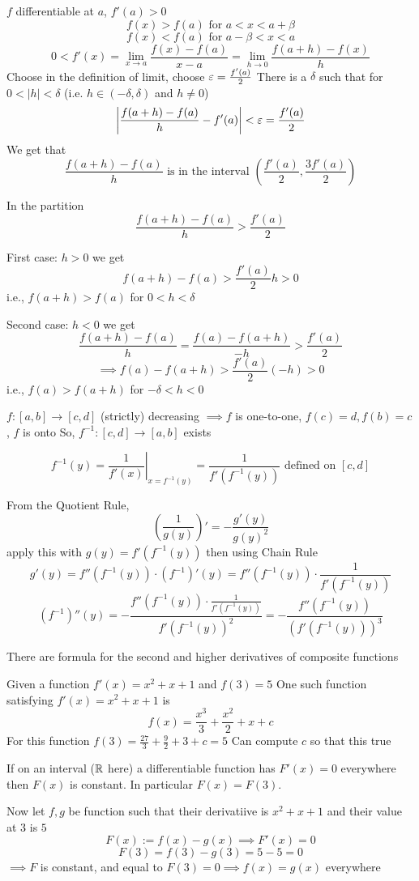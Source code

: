 \begin{example*}[Q2]
  $f$ differentiable at $a$, $f'(a) > 0$  
  $$f(x) > f(a) \text{ for } a < x < a + \beta$$
  $$f(x) < f(a)\text{ for } a - \beta < x < a$$
  $$0 < f'(x) = \lim\limits_{x \to a} \frac{f(x) - f(a)}{x - a} = \lim\limits_{h \to 0}\frac{f(a + h) - f(x)}{h}$$
  Choose in the definition of limit, choose $\varepsilon = \frac{f'(a)}{2}$
  There is a $\delta$ such that for $0 < |h| < \delta$ (i.e. $h \in (-\delta, \delta)$ and $h \neq 0$)
  $$\left|\frac{f(a+h) - f(a)}{h} - f'(a)\right| < \varepsilon = \frac{f'(a)}{2}$$
  We get that $$\frac{f(a+h) - f(a)}{h} \text{ is in the interval }\left(\frac{f'(a)}{2}, \frac{3f'(a)}{2}\right)$$

  In the partition $$\frac{f(a+h) - f(a)}{h} > \frac{f'(a)}{2}$$

  First case: $h > 0$ we get $$f(a + h) - f(a) > \frac{f'(a)}{2}h > 0$$ 
  i.e., $f(a + h) > f(a)$ for $0 < h < \delta$

  Second case: $h < 0$ we get $$\frac{f(a + h) - f(a)}{h} = \frac{f(a) - f(a+h)}{-h} > \frac{f'(a)}{2}$$
  $$\implies f(a) - f(a+h) > \frac{f'(a)}{2}(-h) > 0$$
  i.e., $f(a) > f(a + h)$ for $-\delta < h < 0$
\end{example*}

\begin{example*}[Q9]
  $f: [a, b] \to [c, d]$ (strictly) decreasing $\implies f$ is one-to-one, $f(c) = d, f(b) = c$, $f$ is onto
  So, $f^{-1}:[c, d] \to [a, b]$ exists

  $$f^{-1}(y) = \left.\frac{1}{f'(x)}\right|_{x = f^{-1}(y)} = \frac{1}{f'(f^{-1}(y))}\text{ defined on }[c, d]$$

  From the Quotient Rule, $$\left(\frac{1}{g(y)}\right)' = -\frac{g'(y)}{g(y)^2}$$
  apply this with $g(y) = f'(f^{-1}(y))$ then using Chain Rule
  $$g'(y) = f''(f^{-1}(y)) \cdot (f^{-1})'(y) = f''(f^{-1}(y))\cdot \frac{1}{f'(f^{-1}(y))}$$
  $$(f^{-1})''(y) = - \frac{f''(f^{-1}(y)) \cdot \frac{1}{f'(f^{-1}(y))}}{f'(f^{-1}(y))^2} = -\frac{f''(f^{-1}(y))}{(f'(f^{-1}(y)))^3}$$
\end{example*}

There are formula for the second and higher derivatives of composite functions

\begin{example*}[Q6]
  Given a function $f'(x) = x^2 + x + 1$ and $f(3) = 5$
  One such function satisfying $f'(x) = x^2 + x + 1$ is 
  $$f(x) = \frac{x^3}{3} + \frac{x^2}{2} + x + c$$
  For this function $f(3) = \frac{27}{3} + \frac{9}{2} + 3 + c = 5$
  Can compute $c$ so that this true

  If on an interval ($\mathbb R$ here) a differentiable function has $F'(x) = 0$ everywhere then $F(x)$ is constant.
  In particular $F(x) = F(3)$. 

  Now let $f, g$ be function such that their derivatiive is $x^2 + x + 1$ and their value at $3$ is $5$
  $$F(x):= f(x) - g(x) \implies F'(x) = 0$$
  $$F(3) = f(3) - g(3) = 5 - 5 = 0$$
  $\implies F$ is constant, and equal to $F(3) = 0 \implies f(x) = g(x)$ everywhere   
\end{example*}

